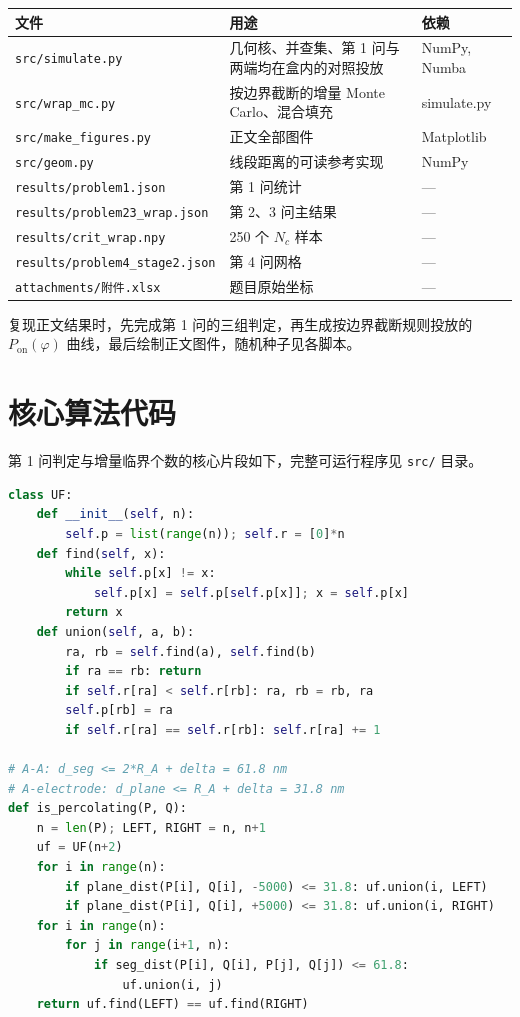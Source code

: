 \documentclass[UTF8,a4paper,zihao=-4,fontset=none]{ctexart}
\begin{document}
\begin{center}
\small
\begin{tabularx}{\textwidth}{lXl}
\toprule
文件 & 用途 & 依赖 \\
\midrule
\texttt{src/simulate.py} & 几何核、并查集、第 1 问与两端均在盒内的对照投放 & NumPy, Numba \\
\texttt{src/wrap\_mc.py} & 按边界截断的增量 Monte Carlo、混合填充 & simulate.py \\
\texttt{src/make\_figures.py} & 正文全部图件 & Matplotlib \\
\texttt{src/geom.py} & 线段距离的可读参考实现 & NumPy \\
\texttt{results/problem1.json} & 第 1 问统计 & --- \\
\texttt{results/problem23\_wrap.json} & 第 2、3 问主结果 & --- \\
\texttt{results/crit\_wrap.npy} & 250 个 $N_c$ 样本 & --- \\
\texttt{results/problem4\_stage2.json} & 第 4 问网格 & --- \\
\texttt{attachments/附件.xlsx} & 题目原始坐标 & --- \\
\bottomrule
\end{tabularx}
\end{center}

复现正文结果时，先完成第 1 问的三组判定，再生成按边界截断规则投放的 $P_{\mathrm{on}}(\varphi)$ 曲线，最后绘制正文图件，随机种子见各脚本。

\section{核心算法代码}

第 1 问判定与增量临界个数的核心片段如下，完整可运行程序见 \texttt{src/} 目录。

\begin{lstlisting}[language=Python,caption={并查集与圆柱段导通判定（节选）}]
class UF:
    def __init__(self, n):
        self.p = list(range(n)); self.r = [0]*n
    def find(self, x):
        while self.p[x] != x:
            self.p[x] = self.p[self.p[x]]; x = self.p[x]
        return x
    def union(self, a, b):
        ra, rb = self.find(a), self.find(b)
        if ra == rb: return
        if self.r[ra] < self.r[rb]: ra, rb = rb, ra
        self.p[rb] = ra
        if self.r[ra] == self.r[rb]: self.r[ra] += 1

# A-A: d_seg <= 2*R_A + delta = 61.8 nm
# A-electrode: d_plane <= R_A + delta = 31.8 nm
def is_percolating(P, Q):
    n = len(P); LEFT, RIGHT = n, n+1
    uf = UF(n+2)
    for i in range(n):
        if plane_dist(P[i], Q[i], -5000) <= 31.8: uf.union(i, LEFT)
        if plane_dist(P[i], Q[i], +5000) <= 31.8: uf.union(i, RIGHT)
    for i in range(n):
        for j in range(i+1, n):
            if seg_dist(P[i], Q[i], P[j], Q[j]) <= 61.8:
                uf.union(i, j)
    return uf.find(LEFT) == uf.find(RIGHT)
\end{lstlisting}
\end{document}
